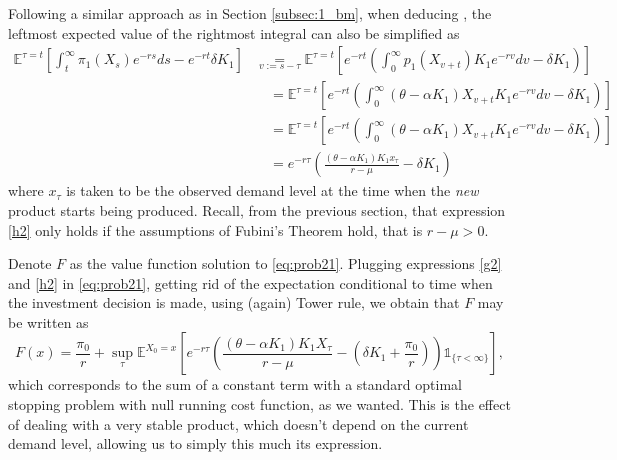 Following a similar approach as in Section \ref{subsec:1_bm}, when deducing , the leftmost expected value of the rightmost integral can also be simplified as
\begin{align}
\mathds{E}^{\tau=t} \left[  \int_t^\infty \pi_1(X_s)e^{-rs} ds -e^{-rt}\delta K_1 \right]
&\underset{v:=s-\tau}{=}  \mathds{E}^{\tau=t} \left[  e^{-rt} \left( \int_0^\infty p_1(X_{v+t}) K_1e^{-rv} dv -\delta K_1 \right) \right] \nonumber \\
& \quad = \mathds{E}^{\tau=t} \left[ e^{-rt} \left( \int_0^\infty (\theta-\alpha K_1)X_{v+t} K_1e^{-rv} dv -\delta K_1 \right) \right] \nonumber \\
& \quad = \mathds{E}^{\tau=t} \left[ e^{-rt} \left( \int_0^\infty (\theta-\alpha K_1)X_{v+t} K_1e^{-rv} dv -\delta K_1 \right) \right] \nonumber \\
& \quad = e^{-r\tau} \left( \frac{(\theta-\alpha K_1)K_1 x_\tau}{r-\mu} -\delta K_1 \right)
\label{h2}
\end{align}
where $x_\tau$ is taken to be the observed demand level at the time when the \textit{new} product starts being produced. Recall, from the previous section, that expression \eqref{h2} only holds if the assumptions of Fubini's Theorem hold, that is $r-\mu>0$.

Denote $F$ as the value function solution to \eqref{eq:prob21}. Plugging expressions \eqref{g2} and \eqref{h2} in \eqref{eq:prob21}, getting rid of the expectation conditional to time when the investment decision is made, using (again) Tower rule, we obtain that $F$ may be written as
\begin{equation}
F(x)=\frac{\pi_0}{r}+ \sup _\tau \mathds{E}^{X_0=x} \left[ e^{-r\tau}\left(\frac{(\theta-\alpha K_1)K_1 X_\tau}{r-\mu} - \left( \delta K_1  +\frac{\pi_0}{r}\right)  \right) \mathds{1}_{ \{\tau < \infty \} } \right],
\label{prob235}
\end{equation}
which corresponds to the sum of a constant term with a standard optimal stopping problem with null running cost function, as we wanted. This is the effect of dealing with a very stable product, which doesn't depend on the current demand level, allowing us to simply this much its expression.


